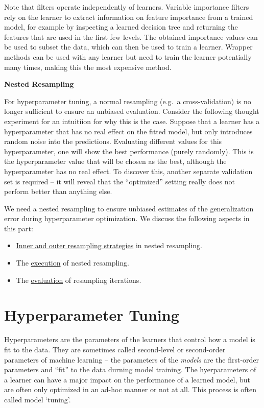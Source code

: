 \documentclass[
]{scrbook}
\providecommand{\tightlist}{%
  \setlength{\itemsep}{0pt}\setlength{\parskip}{0pt}}
\begin{document}
Note that filters operate independently of learners.
Variable importance filters rely on the learner to extract information on feature importance from a trained model, for example by inspecting a learned decision tree and returning the features that are used in the first few levels.
The obtained importance values can be used to subset the data, which can then be used to train a learner.
Wrapper methods can be used with any learner but need to train the learner potentially many times, making this the most expensive method.

\textbf{Nested Resampling}

For hyperparameter tuning, a normal resampling (e.g.~a cross-validation) is no longer sufficient to ensure an unbiased evaluation.
Consider the following thought experiment for an intuitiion for why this is the case.
Suppose that a learner has a hyperparameter that has no real effect on the fitted model, but only introduces random noise into the predictions.
Evaluating different values for this hyperparameter, one will show the best performance (purely randomly).
This is the hyperparameter value that will be chosen as the best, although the hyperparameter has no real effect.
To discover this, another separate validation set is required -- it will reveal that the ``optimized'' setting really does not perform better than anything else.

We need a nested resampling to ensure unbiased estimates of the generalization error during hyperparameter optimization.
We discuss the following aspects in this part:

\begin{itemize}
\tightlist
\item
  \protect\hyperlink{nested-resampling}{Inner and outer resampling strategies} in nested resampling.
\item
  The \protect\hyperlink{nested-resamp-exec}{execution} of nested resampling.
\item
  The \protect\hyperlink{nested-resamp-eval}{evaluation} of resampling iterations.
\end{itemize}

\hypertarget{tuning}{%
\section{Hyperparameter Tuning}\label{tuning}}

Hyperparameters are the parameters of the learners that control how a model is fit to the data.
They are sometimes called second-level or second-order parameters of machine learning -- the parameters of the \emph{models} are the first-order parameters and ``fit'' to the data durning model training.
The hyerparameters of a learner can have a major impact on the performance of a learned model, but are often only optimized in an ad-hoc manner or not at all.
This process is often called model `tuning'.
\end{document}
